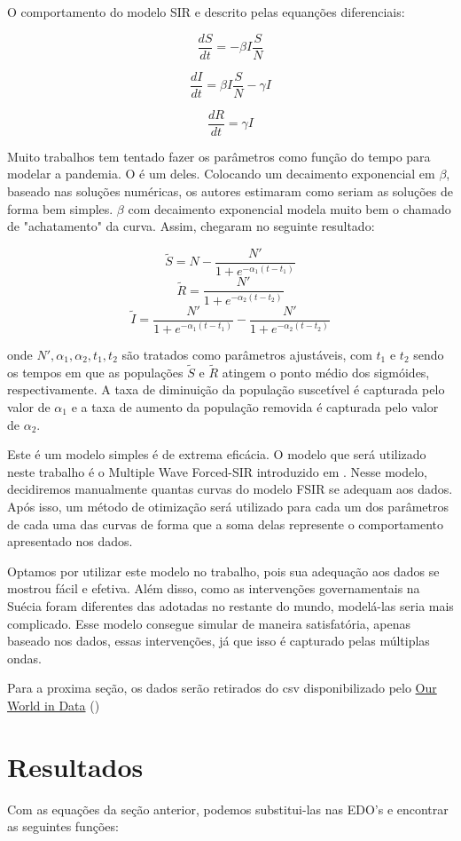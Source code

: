 \documentclass{article}
\begin{document}
O comportamento do modelo SIR e descrito pelas equanções diferenciais:

$$\frac{dS}{dt} = -\beta I \frac{S}{N}$$

$$\frac{dI}{dt} = \beta I \frac{S}{N} - \gamma I$$

$$\frac{dR}{dt} = \gamma I$$

Muito trabalhos tem tentado fazer os parâmetros como função do tempo para modelar a pandemia. O \citep{thefirst100days} é um deles. Colocando um decaimento exponencial em $\beta$, baseado nas soluções numéricas, os autores estimaram como seriam as soluções de forma bem simples. $\beta$ com decaimento exponencial modela muito bem o chamado de "achatamento" da curva. Assim, chegaram no seguinte resultado:

$$\tilde{S} = N-\frac{N'}{1+e^{-\alpha_1(t-t_1)}}$$
$$\tilde{R} = \frac{N'}{1+e^{-\alpha_2(t-t_2)}}$$
$$\tilde{I} = \frac{N'}{1+e^{-\alpha_1(t-t_1)}}-\frac{N'}{1+e^{-\alpha_2(t-t_2)}}$$

onde $N',\alpha_1,\alpha_2,t_1,t_2$ são tratados como parâmetros ajustáveis, com $t_1$ e $t_2$ sendo os tempos em que as populações $\tilde{S}$ e $\tilde{R}$ atingem o ponto médio dos sigmóides, respectivamente. A taxa de diminuição da população suscetível é capturada pelo valor de $\alpha_1$ e a taxa de aumento da população removida é capturada pelo valor de $\alpha_2$.

Este é um modelo simples é de extrema eficácia. O modelo que será utilizado neste trabalho é o Multiple Wave Forced-SIR introduzido em \citep{multiwave}. Nesse modelo, decidiremos manualmente quantas curvas do modelo FSIR se adequam aos dados. Após isso, um método de otimização será utilizado para cada um dos parâmetros de cada uma das curvas de forma que a soma delas represente o comportamento apresentado nos dados.

Optamos por utilizar este modelo no trabalho, pois sua adequação aos dados se mostrou fácil e efetiva. Além disso, como as intervenções governamentais na Suécia foram diferentes das adotadas no restante do mundo, modelá-las seria mais complicado. Esse modelo consegue simular de maneira satisfatória, apenas baseado nos dados, essas intervenções, já que isso é capturado pelas múltiplas ondas.

Para a proxima seção, os dados serão retirados do csv disponibilizado pelo \href{https://ourworldindata.org/coronavirus}{Our World in Data} (\citep{ourworldindata})

\section{Resultados}
Com as equações da seção anterior, podemos substitui-las nas EDO's e encontrar as seguintes funções:
\end{document}
